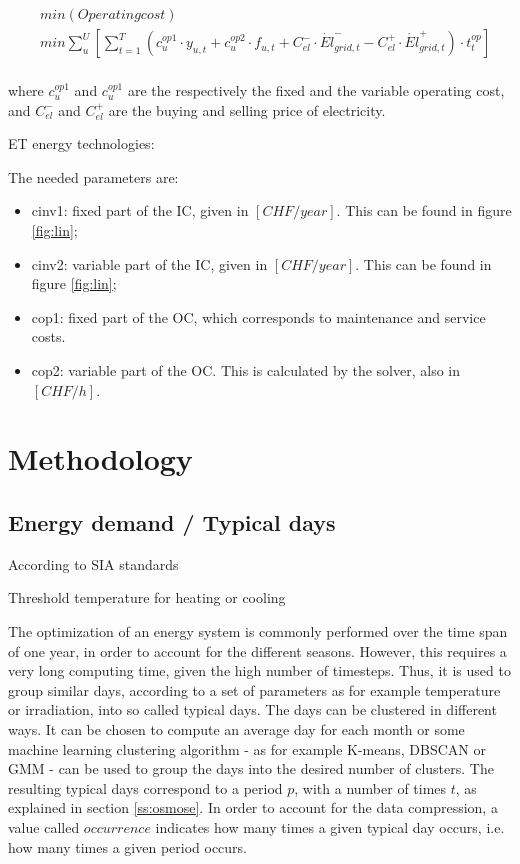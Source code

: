 \documentclass{article}
\begin{document}
\begin{align}
& min \left( Operating cost \right) \\
& min \sum_{u}^{U} \left[ \sum_{t = 1}^{T} \left( c_{u}^{op1} \cdot y_{u,t} + c_{u}^{op2} \cdot f_{u,t} + C_{el}^{-} \cdot \dot{El}_{grid,t}^{-} - C_{el}^{+} \cdot \dot{El}_{grid,t}^{+} \right) \cdot t_{t}^{op} \right] \\
\end{align}

where $c_{u}^{op1}$ and $c_{u}^{op1}$ are the respectively the fixed and the variable operating cost, and $C_{el}^{-}$ and $C_{el}^{+}$ are the buying and selling price of electricity.

ET energy technologies:

The needed parameters are:
\begin{itemize}
	\item cinv1: fixed part of the IC, given in $[CHF/year]$. This can be found in figure \ref{fig:lin};
	\item cinv2: variable part of the IC, given in $[CHF/year]$. This can be found in figure \ref{fig:lin};
	\item cop1: fixed part of the OC, which corresponds to maintenance and service costs. 
	\item cop2: variable part of the OC. This is calculated by the solver, also in $[CHF/h]$.
\end{itemize}

\section{Methodology}

\subsection{Energy demand / Typical days}
According to SIA standards

Threshold temperature for heating or cooling



The optimization of an energy system is commonly performed over the time span of one year, in order to account for the different seasons. However, this requires a very long computing time, given the high number of timesteps. Thus, it is used to group similar days, according to a set of parameters as for example temperature or irradiation, into so called typical days. The days can be clustered in different ways. It can be chosen to compute an average day for each month or some machine learning clustering algorithm - as for example K-means, DBSCAN or GMM - can be used to group the days into the desired number of clusters.
The resulting typical days correspond to a period $p$, with a number of times $t$, as explained in section \ref{ss:osmose}. In order to account for the data compression, a value called $occurrence$ indicates how many times a given typical day occurs, i.e. how many times a given period occurs.\\
\end{document}
